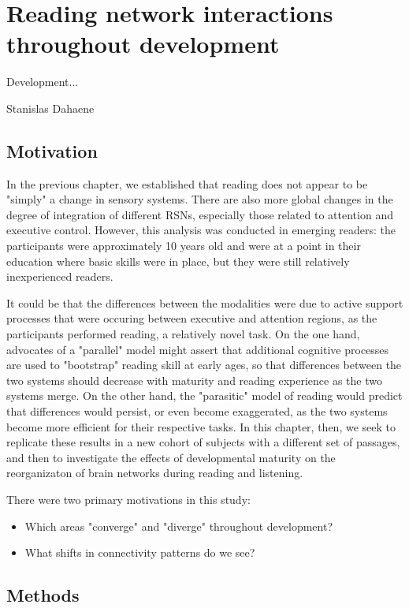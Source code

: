 \chapter{Reading network interactions throughout development}

\epigraph{Development...}{Stanislas Dahaene}

\section{Motivation}

In the previous chapter, we established that reading does not appear to be "simply" a change in sensory systems. There are also more global changes in the degree of integration of different RSNs, especially those related to attention and executive control. However, this analysis was conducted in emerging readers: the participants were approximately 10 years old and were at a point in their education where basic skills were in place, but they were still relatively inexperienced readers.

It could be that the differences between the modalities were due to active support processes that were occuring between executive and attention regions, as the participants performed reading, a relatively novel task. On the one hand, advocates of a "parallel" model might assert that additional cognitive processes are used to "bootstrap" reading skill at early ages, so that differences between the two systems should decrease with maturity and reading experience as the two systems merge. On the other hand, the "parasitic" model of reading would predict that differences would persist, or even become exaggerated, as the two systems become more efficient for their respective tasks. In this chapter, then, we seek to replicate these results in a new cohort of subjects with a different set of passages, and then to investigate the effects of developmental maturity on the reorganizaton of brain networks during reading and listening.

There were two primary motivations in this study:

\begin{itemize}
	\item Which areas "converge" and "diverge" throughout development?
	\item What shifts in connectivity patterns do we see?
\end{itemize} 

\section{Methods}

